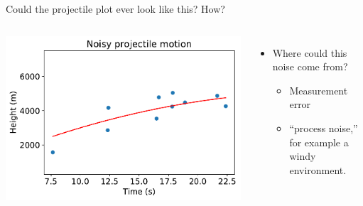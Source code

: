\documentclass[aspectratio=169, handout]{beamer}
\begin{document}
\begin{frame}{Could the projectile plot ever look like this?  How?}

\begin{columns}

\includegraphics[scale=0.5]{data/Huang_et_al/projectile_noise.pdf}


\pause

\begin{itemize}
\item Where could this noise come from?
\begin{itemize}
\item Measurement error
\item ``process noise,'' for example a windy environment.
\end{itemize}
\end{itemize}
\end{columns}

\end{frame}
\end{document}
